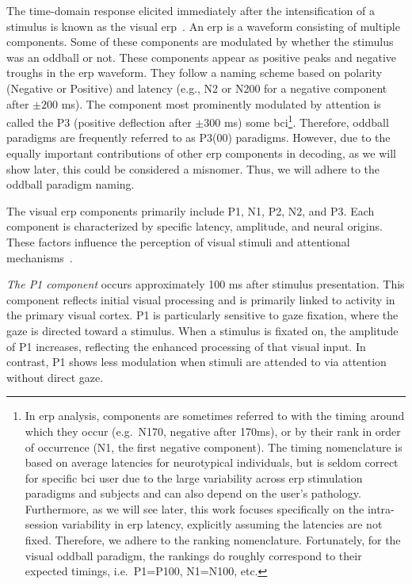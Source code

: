 The time-domain response elicited immediately after the intensification of a
stimulus is known as the visual \ac{erp}~\cite{Luck2014}.
An \ac{erp} is a waveform consisting of multiple components.
Some of these components are modulated by whether the stimulus was an
oddball or not.
These components appear as positive peaks and negative troughs in the \ac{erp}
waveform.
They follow a naming scheme based on polarity (Negative or Positive) and
latency (e.g., N2 or N200 for a negative component after $\pm200$ ms).
The component most prominently modulated by attention is called the P3
(positive deflection after $\pm300$ ms)
some \ac{bci}\footnote{In \ac{erp} analysis,
components are sometimes referred to with the timing around which they occur
(e.g.\ N170, negative after 170ms), or by their rank in order of occurrence
(N1, the first negative component).
The timing nomenclature is based on average latencies for neurotypical
individuals, but is seldom correct for specific \ac{bci} user due to the large
variability across \ac{erp} stimulation paradigms and subjects and can also
depend on the user's pathology.
Furthermore, as we will see later, this work focuses specifically on the
intra-session variability in \ac{erp} latency, explicitly assuming the latencies are not
fixed.
Therefore, we adhere to the ranking nomenclature.
Fortunately, for the visual oddball paradigm, the rankings do roughly
correspond to their expected timings, i.e.\ P1=P100, N1=N100, etc.}.
Therefore, oddball paradigms are frequently referred to as P3(00) paradigms.
However, due to the equally important contributions of other \ac{erp}
components in decoding, as we will show later, this could be considered a
misnomer.
Thus, we will adhere to the oddball paradigm naming.

The visual \ac{erp} components primarily include P1, N1, P2, N2, and P3.
Each component is characterized by specific latency, amplitude, and neural
origins.
These factors influence the perception of visual stimuli and attentional
mechanisms~\cite{Luck2013}.

\emph{The P1 component} occurs approximately 100 ms after stimulus presentation.
This component reflects initial visual processing and is primarily linked to
activity in the primary visual cortex.
P1 is particularly sensitive to gaze fixation, where the gaze is directed
toward a stimulus.
When a stimulus is fixated on, the amplitude of P1 increases, reflecting the
enhanced processing of that visual input.
In contrast, P1 shows less modulation when stimuli are attended to via
attention without direct gaze.

